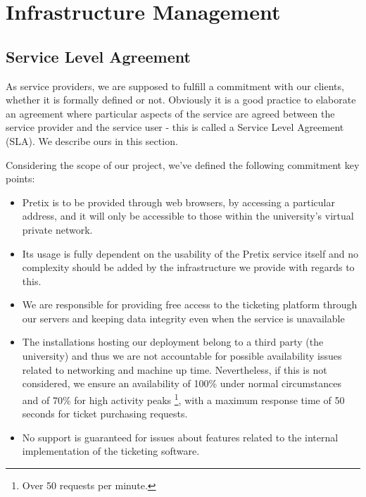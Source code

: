 \documentclass[12pt]{article}
\begin{document}
\newpage
\section{Infrastructure Management} \label{management} %

\subsection{Service Level Agreement} \label{management.sla} %


As service providers, we are supposed to fulfill a commitment with our clients, whether it is formally defined or not.
Obviously it is a good practice to elaborate an agreement where particular aspects of the service are agreed between the service provider and the service user -
this is called a Service Level Agreement (SLA).
We describe ours in this section.

Considering the scope of our project, we've defined the following commitment key points:
\vspace{-10pt}
\begin{itemize}[noitemsep]
  \item Pretix is to be provided through web browsers, by accessing a particular address, and it will only be accessible to those within the university's virtual private network.
  \item Its usage is fully dependent on the usability of the Pretix service itself and no complexity should be added by the infrastructure we provide with regards to this.
  \item We are responsible for providing free access to the ticketing platform through our servers and keeping data integrity even when the service is unavailable
  \item The installations hosting our deployment belong to a third party (the university) and thus we are not accountable for possible availability issues related to networking and machine up time.
        Nevertheless, if this is not considered, we ensure an availability of 100\% under normal circumstances and of 70\% for high activity peaks \footnote{Over 50 requests per minute.}, with a maximum response time of 50 seconds for ticket purchasing requests.
  \item No support is guaranteed for issues about features related to the internal implementation of the ticketing software.
\end{itemize}
\vspace{-10pt}
\end{document}
